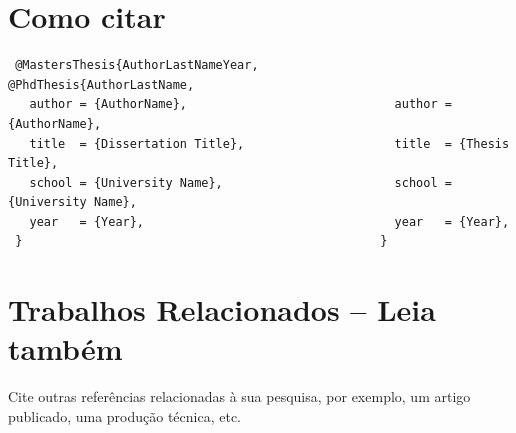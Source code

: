 \documentclass{ppgi-resumo}
\begin{document}
\section*{Como citar}
\begin{minipage}{\linewidth}
\color{colorUTFPR}
\begin{verbatim}
 @MastersThesis{AuthorLastNameYear,                 @PhdThesis{AuthorLastName,                            
   author = {AuthorName},                             author = {AuthorName},    
   title  = {Dissertation Title},                     title  = {Thesis Title},
   school = {University Name},                        school = {University Name},
   year   = {Year},                                   year   = {Year},
 }                                                  }
\end{verbatim}

\end{minipage}
\section*{Trabalhos Relacionados -- Leia também }

\textcolor{colorUTFPR}{Cite outras referências relacionadas à sua pesquisa, por exemplo, um artigo publicado, uma produção técnica, etc.}
\end{document}
